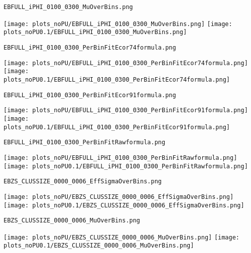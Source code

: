 \begin{frame}[fragile]
\begin{verbatim}
EBFULL_iPHI_0100_0300_MuOverBins.png
\end{verbatim}
\texttt{[image: plots\_noPU/EBFULL\_iPHI\_0100\_0300\_MuOverBins.png]}
\texttt{[image: plots\_noPU0.1/EBFULL\_iPHI\_0100\_0300\_MuOverBins.png]}
\end{frame}
\begin{frame}[fragile]
\begin{verbatim}
EBFULL_iPHI_0100_0300_PerBinFitEcor74formula.png
\end{verbatim}
\texttt{[image: plots\_noPU/EBFULL\_iPHI\_0100\_0300\_PerBinFitEcor74formula.png]}
\texttt{[image: plots\_noPU0.1/EBFULL\_iPHI\_0100\_0300\_PerBinFitEcor74formula.png]}
\end{frame}
\begin{frame}[fragile]
\begin{verbatim}
EBFULL_iPHI_0100_0300_PerBinFitEcor91formula.png
\end{verbatim}
\texttt{[image: plots\_noPU/EBFULL\_iPHI\_0100\_0300\_PerBinFitEcor91formula.png]}
\texttt{[image: plots\_noPU0.1/EBFULL\_iPHI\_0100\_0300\_PerBinFitEcor91formula.png]}
\end{frame}
\begin{frame}[fragile]
\begin{verbatim}
EBFULL_iPHI_0100_0300_PerBinFitRawformula.png
\end{verbatim}
\texttt{[image: plots\_noPU/EBFULL\_iPHI\_0100\_0300\_PerBinFitRawformula.png]}
\texttt{[image: plots\_noPU0.1/EBFULL\_iPHI\_0100\_0300\_PerBinFitRawformula.png]}
\end{frame}
\begin{frame}[fragile]
\begin{verbatim}
EBZS_CLUSSIZE_0000_0006_EffSigmaOverBins.png
\end{verbatim}
\texttt{[image: plots\_noPU/EBZS\_CLUSSIZE\_0000\_0006\_EffSigmaOverBins.png]}
\texttt{[image: plots\_noPU0.1/EBZS\_CLUSSIZE\_0000\_0006\_EffSigmaOverBins.png]}
\end{frame}
\begin{frame}[fragile]
\begin{verbatim}
EBZS_CLUSSIZE_0000_0006_MuOverBins.png
\end{verbatim}
\texttt{[image: plots\_noPU/EBZS\_CLUSSIZE\_0000\_0006\_MuOverBins.png]}
\texttt{[image: plots\_noPU0.1/EBZS\_CLUSSIZE\_0000\_0006\_MuOverBins.png]}
\end{frame}

